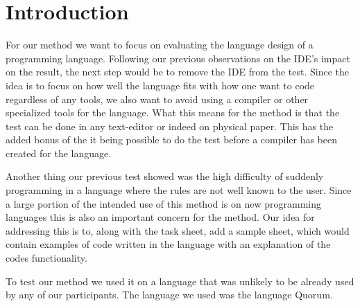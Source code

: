 \chapter{Introduction}
\label{chapter:MethodIntro}
For our method we want to focus on evaluating the language design of a programming language.
Following our previous observations on the IDE's impact on the result, the next step would be to remove the IDE from the test.
Since the idea is to focus on how well the language fits with how one want to code regardless of any tools, we also want to avoid using a compiler or other specialized tools for the language.%
What this means for the method is that the test can be done in any text-editor or indeed on physical paper.
This has the added bonus of the it being possible to do the test before a compiler has been created for the language.

Another thing our previous test showed was the high difficulty of suddenly programming in a language where the rules are not well known to the user.
Since a large portion of the intended use of this method is on new programming languages this is also an important concern for the method.
Our idea for addressing this is to, along with the task sheet, add a sample sheet, which would contain examples of code written in the language with an explanation of the codes functionality.

To test our method we used it on a language that was unlikely to be already used by any of our participants.
The language we used was the language Quorum\cite{Quorum}.